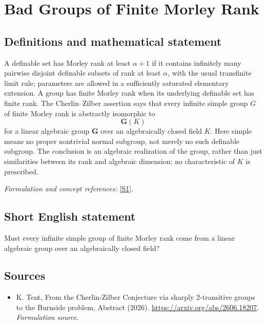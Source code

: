 \documentclass[11pt]{article}
\begin{document}
\section*{\texorpdfstring{Bad Groups of Finite Morley Rank}{Bad Groups of Finite Morley Rank}}\label{statement}
\subsection{Definitions and mathematical statement}
A definable set has Morley rank at least $\alpha+1$ if it contains infinitely many pairwise disjoint definable subsets of rank at least $\alpha$, with the usual transfinite limit rule; parameters are allowed in a sufficiently saturated elementary extension. A group has finite Morley rank when its underlying definable set has finite rank. The Cherlin--Zilber assertion says that every infinite simple group $G$ of finite Morley rank is abstractly isomorphic to
\[
 \mathbf G(K)
\]
for a linear algebraic group $\mathbf G$ over an algebraically closed field $K$. Here simple means no proper nontrivial normal subgroup, not merely no such definable subgroup. The conclusion is an algebraic realization of the group, rather than just similarities between its rank and algebraic dimension; no characteristic of $K$ is prescribed.
\par\smallskip\textit{Formulation and concept references:} \href{https://arxiv.org/abs/2606.18207}{[S1]}.

\subsection{Short English statement}
Must every infinite simple group of finite Morley rank come from a linear algebraic group over an algebraically closed field?
\subsection{Sources}
\begin{itemize}
\item[S1]K. Tent, From the Cherlin-Zilber Conjecture via sharply 2-transitive groups to the Burnside problem, Abstract (2026).
\url{https://arxiv.org/abs/2606.18207}.
\textit{Formulation source.}
\end{itemize}
\end{document}
